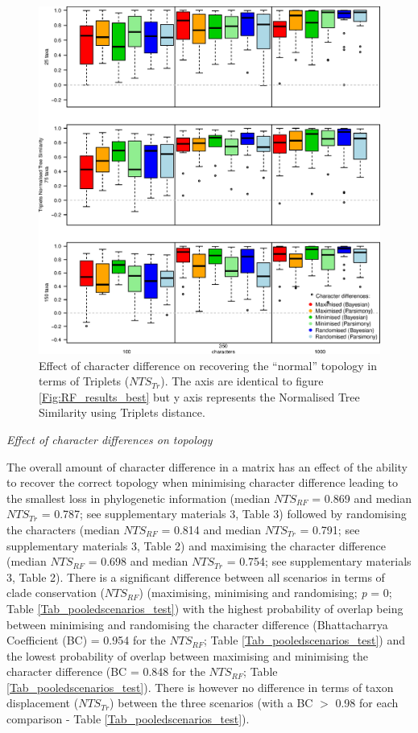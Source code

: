 \documentclass[12pt,letterpaper]{article}
\renewcommand{\subsection}[1]{%
\bigskip
\begin{center}
\begin{large}
\normalfont\itshape #1
\end{large}
\end{center}}
\begin{document}
\begin{figure}[!htbp]
\centering
   \includegraphics[width=1\textwidth]{Tr_results_best.eps}
\caption{Effect of character difference on recovering the ``normal'' topology in terms of Triplets ($NTS_{Tr}$). The axis are identical to figure \ref{Fig:RF_results_best} but y axis represents the Normalised Tree Similarity using Triplets distance.}
\label{Fig:Tr_results_best}
\end{figure}

\subsection{Effect of character differences on topology}

The overall amount of character difference in a matrix has an effect of the ability to recover the correct topology when minimising character difference leading to the smallest loss in phylogenetic information (median $NTS_{RF}$ = 0.869 and median $NTS_{Tr}$ = 0.787; see supplementary materials 3, Table 3) followed by randomising the characters (median $NTS_{RF}$ = 0.814 and median $NTS_{Tr}$ = 0.791; see supplementary materials 3, Table 2) and maximising the character difference (median $NTS_{RF}$ = 0.698 and median $NTS_{Tr}$ = 0.754; see supplementary materials 3, Table 2).
There is a significant difference between all scenarios in terms of clade conservation ($NTS_{RF}$) (maximising, minimising and randomising; \textit{p} = 0; Table \ref{Tab_pooledscenarios_test}) with the highest probability of overlap being between minimising and randomising the character difference (Bhattacharrya Coefficient (BC) = 0.954 for the $NTS_{RF}$; Table \ref{Tab_pooledscenarios_test}) and the lowest probability of overlap between maximising and minimising the character difference (BC = 0.848 for the $NTS_{RF}$; Table \ref{Tab_pooledscenarios_test}).
There is however no difference in terms of taxon displacement ($NTS_{Tr}$) between the three scenarios (with a BC $>$ 0.98 for each comparison - Table \ref{Tab_pooledscenarios_test}).
\end{document}
